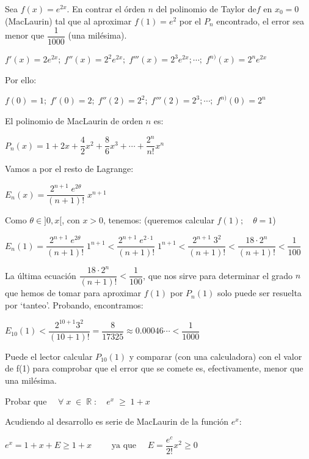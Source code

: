 	\begin{ejre} Sea $f(x)=e^{2x}$. En contrar el órden $n$ del polinomio de Taylor de$f$ en $x_0=0$ (MacLaurin) tal que al aproximar $f(1)=e^2$ por el $P_n$ encontrado, el error sea menor que $\dfrac 1 {1000}$ (una milésima).
		
	\end{ejre}
	
	\begin{proofw}\renewcommand{\qedsymbol}{$\diamond$}	
		
		$f'(x)=2e^{2x}; \; f''(x)=2^2 e^{2x}; \; f'''(x)=2^3 e^{2x}; \cdots ; \; f^{n)}(x)=2^n e^{2x}$
		
		Por ello:
		
		$f(0)=1; \; f'(0)=2; \; f''(2)=2^2; \; f'''(2)=2^3; \cdots ; \; f^{n)}(0)=2^n$
		
		El polinomio de MacLaurin de orden $n$ es:
		
		$P_n(x)=1+ 2x+\dfrac{4}{2}x^2+\dfrac{8}{6}x^3+ \cdots + \dfrac{2^n}{n!}x^n$
		
		Vamos a por el resto de Lagrange:
		
		$E_n(x)=\dfrac{2^{n+1}\; e^{2\theta}}{(n+1)!}\; x^{n+1}$
		
		Como $\theta\in]0,x[$, con $x>0$, tenemos: (queremos calcular $f(1); \quad \theta=1$)
		
		
		$E_n(1)=\dfrac{2^{n+1}\; e^{2 \theta}}{(n+1)!}\; 1^{n+1} < 
		\dfrac{2^{n+1}\; e^{2\cdot 1}}{(n+1)!}\; 1^{n+1} <
		 \dfrac{2^{n+1}\; 3^{2}}{(n+1)!} < \dfrac {18\cdot 2^n}{(n+1)!} < \dfrac {1}{100}  $
		
		
		La última ecuación $\dfrac {18\cdot 2^n}{(n+1)!} < \dfrac {1}{100}  $, que nos sirve para determinar el grado $n$ que hemos de tomar para aproximar $f(1)$ por $P_n(1)$ solo puede ser resuelta por `tanteo'. Probando, encontramos:
		
		$E_{10}(1)<\dfrac {2^{10+1}3^2}{(10+1)!}=\dfrac {8}{17325}\approx 0.00046\cdots < \dfrac {1}{1000}$
		
		Puede el lector calcular $P_{10}(1)$ y comparar (con una calculadora) con el valor de f(1) para comprobar que el error que se comete es, efectivamente, menor que una milésima.

	\end{proofw}

	\begin{ejre} Probar que $\quad \forall \; x \; \in \; \mathbb{R}\; : \quad e^x \; \ge \; 1 + x$
		
	\end{ejre}
	\vspace{-3mm}
	\begin{proofw}\renewcommand{\qedsymbol}{$\diamond$}	
		Acudiendo al desarrollo es serie de MacLaurin de la función $e^x$:
		
		$e^x=1+x+E\ge 1+x \qquad \mbox{ ya que } \quad E=\dfrac {e^c}{2!}x^2\ge 0$
	\end{proofw}

	
	

	 	
	

	
